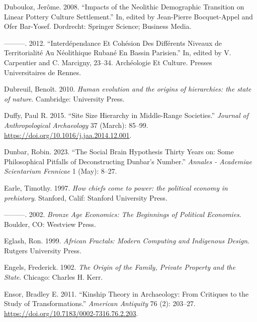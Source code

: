 \documentclass[
  12pt,
  a4paper, twoside]{book}
\newlength{\cslhangindent}
\newlength{\cslentryspacingunit} %
\newenvironment{CSLReferences}[2] %
 {%
  \setlength{\parindent}{0pt}
  \ifodd #1
  \let\oldpar\par
  \def\par{\hangindent=\cslhangindent\oldpar}
  \fi
  \setlength{\parskip}{#2\cslentryspacingunit}
 }%
 {}
\begin{document}
\begin{CSLReferences}{1}{0}
\leavevmode{}%
Dubouloz, Jerôme. 2008. {``Impacts of the Neolithic Demographic Transition on Linear Pottery Culture Settlement.''} In, edited by Jean-Pierre Bocquet-Appel and Ofer Bar-Yosef. Dordrecht: Springer Science; Business Media.

\leavevmode{}%
---------. 2012. {``Interdépendance Et Cohésion Des Différents Niveaux de Territorialité Au Néolithique Rubané En Bassin Parisien.''} In, edited by V. Carpentier and C. Marcigny, 23--34. Archéologie Et Culture. Presses Universitaires de Rennes.

\leavevmode{}%
Dubreuil, Benoît. 2010. \emph{Human evolution and the origins of hierarchies: the state of nature}. Cambridge: University Press.

\leavevmode{}%
Duffy, Paul R. 2015. {``Site Size Hierarchy in Middle-Range Societies.''} \emph{Journal of Anthropological Archaeology} 37 (March): 85--99. \url{https://doi.org/10.1016/j.jaa.2014.12.001}.

\leavevmode{}%
Dunbar, Robin. 2023. {``The Social Brain Hypothesis Thirty Years on: Some Philosophical Pitfalls of Deconstructing Dunbar's Number.''} \emph{Annales - Academiae Scientarium Fennicae} 1 (May): 8--27.

\leavevmode{}%
Earle, Timothy. 1997. \emph{How chiefs come to power: the political economy in prehistory}. Stanford, Calif: Stanford University Press.

\leavevmode{}%
---------. 2002. \emph{Bronze Age Economics: The Beginnings of Political Economies}. Boulder, CO: Westview Press.

\leavevmode{}%
Eglash, Ron. 1999. \emph{African Fractals: Modern Computing and Indigenous Design}. Rutgers University Press.

\leavevmode{}%
Engels, Frederick. 1902. \emph{The Origin of the Family, Private Property and the State}. Chicago: Charles H. Kerr.

\leavevmode{}%
Ensor, Bradley E. 2011. {``Kinship Theory in Archaeology: From Critiques to the Study of Transformations.''} \emph{American Antiquity} 76 (2): 203--27. \url{https://doi.org/10.7183/0002-7316.76.2.203}.


\end{CSLReferences}
\end{document}
